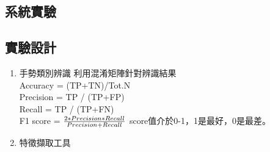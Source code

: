 \documentclass[12pt,a4paper]{report}
\begin{document}
\begin{CJK*}{UTF8}{bkai}
    \chapter{系統實驗}
    \section{實驗設計}

    \begin{enumerate}
        \item 手勢類別辨識
              利用混淆矩陣針對辨識結果\\
              Accuracy = (TP+TN)/Tot.N \\
              Precision = TP / (TP+FP) \\
              Recall = TP / (TP+FN) \\
              F1 score =
              \begin{math}
                  \frac{2*Precision*Recall}{Precision+Recall} \\
              \end{math}
              score值介於0-1，1是最好，0是最差。 \\
              \begin{table}[htbp]
                  \vspace{0.3cm}
              \end{table}

        \item 特徵擷取工具



\end{enumerate}
\end{CJK*}
\end{document}
